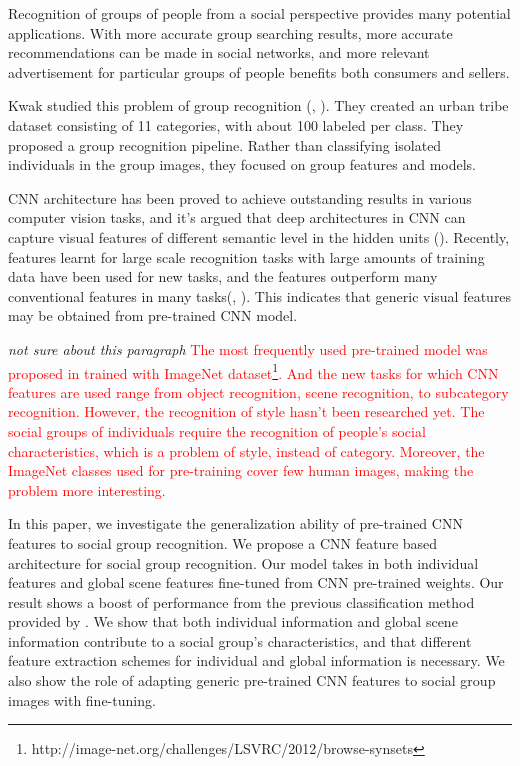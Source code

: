 \documentclass[10pt,twocolumn,letterpaper]{article}
\begin{document}
Recognition of groups of people from a social perspective provides many potential applications.  With more accurate group searching results, more accurate recommendations can be made in social networks, and more relevant advertisement for particular groups of people benefits both consumers and sellers.

Kwak \etal studied this problem of group recognition (\cite{urbantribe2}, \cite{urbantribe}). They created an urban tribe dataset consisting of 11 categories, with about 100 labeled per class.  They proposed a group recognition pipeline. Rather than classifying isolated individuals in the group images, they focused on group features and models.

CNN architecture has been proved to achieve outstanding results in various computer vision tasks, and it's argued that deep architectures in CNN can capture visual features of different semantic level in the hidden units (\cite{ImageNet13}). Recently, features learnt for large scale recognition tasks with large amounts of training data have been used for new tasks, and the features outperform many conventional features in many tasks(\cite{ImageNet13}, \cite{decaf}). This indicates that generic visual features may be obtained from pre-trained CNN model. 

\emph{not sure about this paragraph}
\textcolor{red} {The most frequently used pre-trained model was proposed in \cite{ImageNet} trained with ImageNet dataset\footnote{http://image-net.org/challenges/LSVRC/2012/browse-synsets}. And the new tasks for which CNN features are used range from object recognition, scene recognition, to subcategory recognition. However, the recognition of style hasn't been researched yet. The social groups of individuals require the recognition of people's social characteristics, which is a problem of style, instead of category. Moreover, the ImageNet classes used for pre-training cover few human images, making the problem more interesting.}




In this paper, we investigate the generalization ability of pre-trained CNN features to social group recognition.
We propose a CNN feature based architecture for social group recognition. Our model takes in both individual features and global scene features fine-tuned from CNN pre-trained weights. Our result shows a boost of performance from the previous classification method provided by \cite{urbantribe2}. We show that both individual information and global scene information contribute to a social group's characteristics, and that different feature extraction schemes for individual and global information is necessary. We also show the role of adapting generic pre-trained CNN features to social group images with fine-tuning. 
\end{document}
